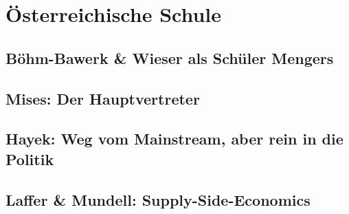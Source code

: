 %
%
%

\chapter{Österreichische Schule}
\label{Austria}


\section{Böhm-Bawerk \& Wieser als Schüler Mengers}

\section{Mises: Der Hauptvertreter}

\section{Hayek: Weg vom Mainstream, aber rein in die Politik}

\section{Laffer \& Mundell: Supply-Side-Economics}

